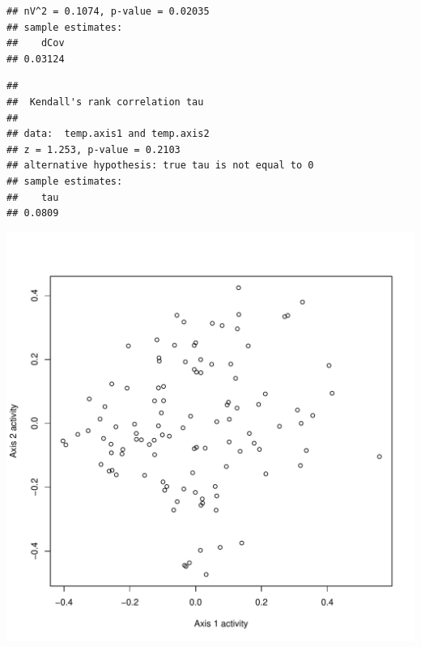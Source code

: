 \documentclass{article}
\begin{document}
\begin{knitrout}
\begin{kframe}
\begin{verbatim}
## nV^2 = 0.1074, p-value = 0.02035
## sample estimates:
##    dCov 
## 0.03124
\end{verbatim}
\begin{alltt}
  \hlstd{=} \hlstd{)}
\end{alltt}
\begin{verbatim}
## 
## 	Kendall's rank correlation tau
## 
## data:  temp.axis1 and temp.axis2
## z = 1.253, p-value = 0.2103
## alternative hypothesis: true tau is not equal to 0
## sample estimates:
##    tau 
## 0.0809
\end{verbatim}
\begin{alltt}
 \hlopt{~}   \hlstd{=} \hlstd{,}  \hlstd{=} \hlstd{)}
\end{alltt}
\end{kframe}

{\centering \includegraphics[width=\maxwidth]{figure/metagene-pairs-10} 

}



\end{knitrout}
\end{document}

